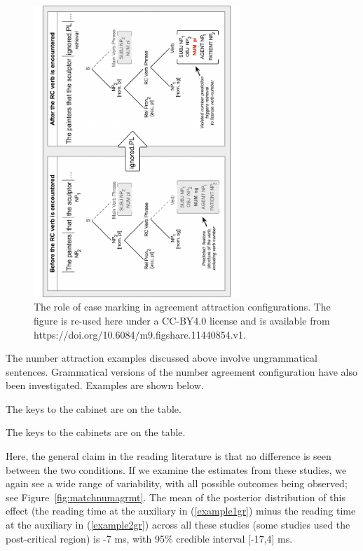 \documentclass{cambridge7A}\usepackage[]{graphicx}\usepackage[]{color}
\begin{document}
\begin{figure}[!htbp]
\centering
\includegraphics[height=11cm,angle=-90]{figures/serine}
\caption{The role of case marking in agreement attraction configurations. The figure is re-used here under a CC-BY4.0 license and is available from https://doi.org/10.6084/m9.figshare.11440854.v1.}\label{fig:serinecase}
\end{figure} 

The number attraction examples discussed above involve  ungrammatical sentences.
Grammatical versions of the number agreement configuration have also been investigated. Examples are shown below.

 \begin{exe} 
\ex
\begin{xlist}
\item \label{example2gr}
The keys to the cabinet are on the table.
\item \label{example1gr}
The keys to the cabinets are on the table.
\end{xlist}
\end{exe}



 Here, the general claim in the reading literature \citep{lago2015agreement} is that no difference is seen between the two conditions. If we examine the estimates from these studies, 
  we again see a wide range of variability, with all possible outcomes being observed; see Figure~\ref{fig:matchnumagrmt}. 
The mean of the posterior distribution of this effect
(the reading time at the auxiliary in (\ref{example1gr}) minus the reading time at the auxiliary in (\ref{example2gr})  across all these studies (some studies used the post-critical region) is   
-7 ms, with 95\% credible interval [-17,4] ms.
\end{document}
